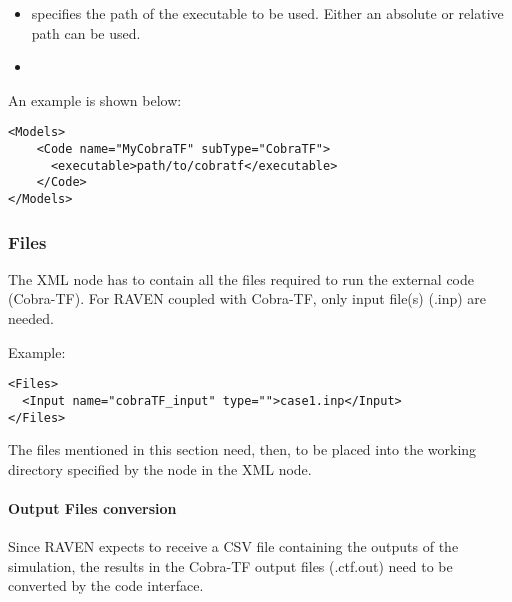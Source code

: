 \subnodesIntro
%
\begin{itemize}
  \item {}  specifies the path
  of the executable to be used.
  \nb Either an absolute or relative path can be used.
  \item {}
\end{itemize}

An example  is shown  below:
\begin{lstlisting}[style=XML]
<Models>
    <Code name="MyCobraTF" subType="CobraTF">
      <executable>path/to/cobratf</executable>
    </Code>
</Models>
\end{lstlisting}

\subsubsection{Files}
The  XML node has to contain all the files required to run the external code  (Cobra-TF). 
For RAVEN coupled with Cobra-TF, only input file(s) (.inp) are needed.

Example:
\begin{lstlisting}[style=XML]
<Files>
  <Input name="cobraTF_input" type="">case1.inp</Input>
</Files>
\end{lstlisting}
The files mentioned in this section
 need, then, to be placed into the working directory specified
by the  node in the  XML node.

\paragraph{Output Files conversion}
Since RAVEN expects to receive a CSV file containing the outputs of the simulation, the results in the Cobra-TF output
files (.ctf.out) need to be converted by the code interface.

